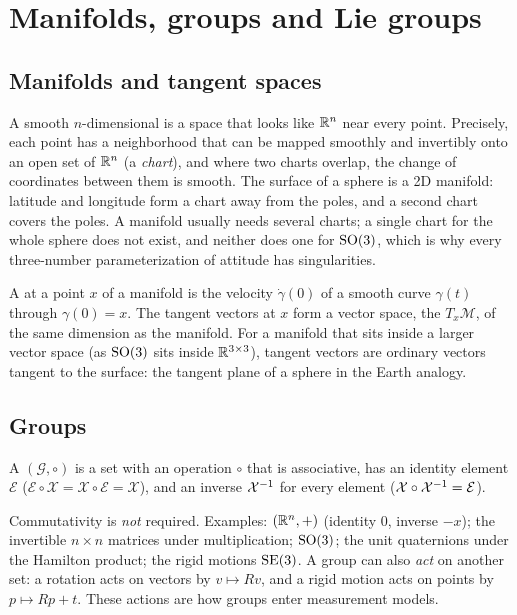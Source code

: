 \section{Manifolds, groups and Lie groups}

\subsection{Manifolds and tangent spaces}

A smooth $n$-dimensional  is a space that looks like $\mathbb{R}^n$ near every point. Precisely, each point has a neighborhood that can be
mapped smoothly and invertibly onto an open set of $\mathbb{R}^n$ (a \emph{chart}), and where two charts overlap, the change of coordinates between them is
smooth. The surface of a sphere is a 2D manifold: latitude and longitude form a chart away from the poles, and a second chart covers the poles. A
manifold usually needs several charts; a single chart for the whole sphere does not exist, and neither does one for $\mathrm{SO}(3)$, which is why every
three-number parameterization of attitude has singularities.

A  at a point $x$ of a manifold is the velocity $\dot\gamma(0)$ of a smooth curve $\gamma(t)$ through $\gamma(0) = x$. The tangent vectors
at $x$ form a vector space, the  $T_x\mathcal M$, of the same dimension as the manifold. For a manifold that sits inside a larger
vector space (as $\mathrm{SO}(3)$ sits inside $\mathbb{R}^{3\times3}$), tangent vectors are ordinary vectors tangent to the surface: the tangent plane of a sphere
in the Earth analogy.

\subsection{Groups}

\begin{definition}[Group]
A  $(\mathcal{G}, \circ)$ is a set with an operation $\circ$ that is associative, has an identity element $\mathcal{E}$
($\mathcal{E}\circ\mathcal{X} = \mathcal{X}\circ\mathcal{E} = \mathcal{X}$), and an inverse $\mathcal{X}^{-1}$ for every element
($\mathcal{X}\circ\mathcal{X}^{-1} = \mathcal{E}$).
\end{definition}

Commutativity is \emph{not} required. Examples: $(\mathbb{R}^n, +)$ (identity $0$, inverse $-x$); the invertible $n\times n$ matrices under multiplication;
$\mathrm{SO}(3)$; the unit quaternions under the Hamilton product; the rigid motions $\mathrm{SE}(3)$. A group can also \emph{act} on another set: a rotation acts on
vectors by $v \mapsto Rv$, and a rigid motion acts on points by $p \mapsto Rp + t$. These actions are how groups enter measurement models.

